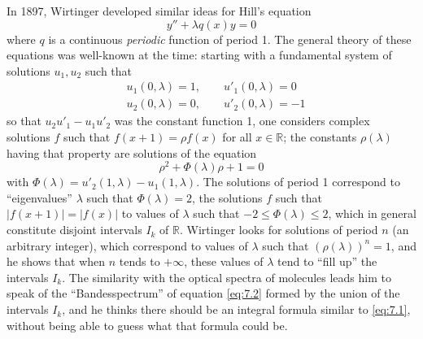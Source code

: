 \documentclass[12pt,a4paper,leqno,twoside]{extbook}
\newcommand{\R}{\mathbb{R}}
\begin{document}
In 1897, Wirtinger \cite{230} developed similar ideas for Hill's equation
\begin{equation}
    \label{eq:7.2}
    y'' + \lambda q(x) y = 0
\end{equation}
where \(q\) is a continuous \emph{periodic} function of period 1. The general theory of these equations was well-known at the time: starting with a fundamental system of solutions \(u_1, u_2\) such that
\[
    \begin{aligned}
        &u_1(0, \lambda) = 1, \qquad u'_1(0, \lambda) =  0 \\
        &u_2(0, \lambda) = 0, \qquad u'_2(0, \lambda) = -1
    \end{aligned}
\]
so that \(u_2 u'_1 - u_1 u'_2\) was the constant function 1, one considers complex solutions \(f\) such that \(f(x+1) = \rho f(x)\) for all \(x \in \R\); the constants \(\rho(\lambda)\) having that property are solutions of the equation
\begin{equation}
    \label{eq:7.3}
    \rho^2 + \Phi(\lambda) \rho + 1 = 0
\end{equation}
with \(\Phi(\lambda) = u'_2(1, \lambda) - u_1(1, \lambda)\). The solutions of period 1 correspond to ``eigenvalues'' \(\lambda\) such that \(\Phi(\lambda) = 2\), the solutions \(f\) such that \(|f(x+1)| = |f(x)|\) to values of \(\lambda\) such that \(-2 \leq \Phi(\lambda) \leq 2\), which in general constitute disjoint intervals \(I_k\) of \(\R\). Wirtinger looks for solutions of period \(n\) (an arbitrary integer), which correspond to values of \(\lambda\) such that \((\rho(\lambda))^n = 1\), and he shows that when \(n\) tends to \(+\infty\), these values of \(\lambda\) tend to ``fill up'' the intervals \(I_k\). The similarity with the optical spectra of molecules leads him to speak of the ``Bandesspectrum'' of equation \eqref{eq:7.2} formed by the union of the intervals \(I_k\), and he thinks there should be an integral formula similar to \eqref{eq:7.1}, without being able to guess what that formula could be.
\end{document}
